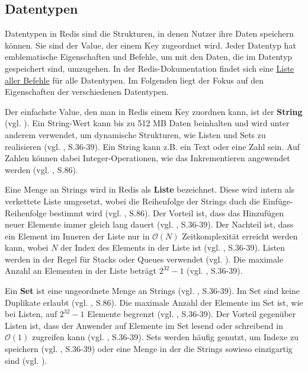 
\subsection{Datentypen}
\label{subsec:datentypen}

Datentypen in \ac{Redis} sind die Strukturen, in denen Nutzer ihre Daten speichern können. Sie sind der Value, der einem Key zugeordnet wird. Jeder Datentyp hat emblematische Eigenschaften und Befehle, um mit den Daten, die im Datentyp gespeichert sind, umzugehen. In der \ac{Redis}-Dokumentation findet sich eine \href{https://redis.io/commands}{Liste aller Befehle} für alle Datentypen. Im Folgenden liegt der Fokus auf den Eigenschaften der verschiedenen Datentypen. 

Der einfachste Value, den man in \ac{Redis} einem Key zuordnen kann, ist der \textbf{String} (vgl. \cite{Redis-Docs-String}). Ein String-Wert kann bis zu 512 MB Daten beinhalten und wird unter anderem verwendet, um dynamische Strukturen, wie Listen und Sets zu realisieren (vgl. \cite{4}, S.36-39). Ein String kann z.B. ein Text oder eine Zahl sein. Auf Zahlen können dabei Integer-Operationen, wie das Inkrementieren angewendet werden (vgl. \cite{nosql}, S.86).

Eine Menge an Strings wird in \ac{Redis} als \textbf{Liste} bezeichnet. Diese wird intern als verkettete Liste umgesetzt, wobei die Reihenfolge der Strings duch die Einfüge-Reihenfolge bestimmt wird (vgl. \cite{nosql}, S.86). Der Vorteil ist, dass das Hinzufügen neuer Elemente immer gleich lang dauert (vgl. \cite{4}, S.36-39). Der Nachteil ist, dass ein Element im Inneren der Liste nur in $\mathcal{O}(N)$ Zeitkomplexität erreicht werden kann, wobei $N$ der Index des Elements in der Liste ist (vgl. \cite{4}, S.36-39). Listen werden in der Regel für Stacks oder Queues verwendet (vgl. \cite{Redis-Docs-List}). Die maximale Anzahl an Elementen in der Liste beträgt $2^{32} - 1$ (vgl. \cite{4}, S.36-39).

Ein \textbf{Set} ist eine ungeordnete Menge an Strings (vgl. \cite{4}, S.36-39). Im Set sind keine Duplikate erlaubt (vgl. \cite{nosql}, S.86). Die maximale Anzahl der Elemente im Set ist, wie bei Listen, auf $2^{32} - 1$ Elemente begrenzt (vgl. \cite{4}, S.36-39). Der Vorteil gegenüber Listen ist, dass der Anwender auf Elemente im Set lesend oder schreibend in $\mathcal{O}(1)$ zugreifen kann (vgl. \cite{4}, S.36-39). Sets werden häufig genutzt, um Indexe zu speichern (vgl. \cite{4}, S.36-39) oder eine Menge in der die Strings sowieso einzigartig sind (vgl. \cite{Redis-Docs-Set}).

